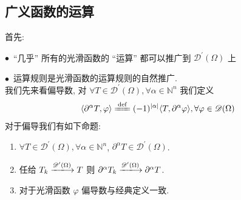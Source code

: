 \documentclass[11pt]{ctexart}[UTF8]
\begin{document}
\subsection{广义函数的运算}
首先:\par
$\bullet$\ ``几乎'' 所有的光滑函数的 ``运算'' 都可以推广到 $\mathscr{D}^{\prime}(\Omega)$ 上\par
$\bullet$\  运算规则是光滑函数的运算规则的自然推广.\\
我们先来看偏导数, 对 $\forall T \in \mathscr{D}^{\prime}(\Omega), \forall \alpha\in \mathbb{N}^{n}$ 我们定义
\begin{equation*}
    \langle \partial^{\alpha} T, \varphi \rangle \xlongequal{\mathrm{def}} (-1)^{|\alpha|} \langle T, \partial^{\alpha} \varphi \rangle, \forall \varphi \in \mathscr{D}(\Omega)
\end{equation*}
对于偏导我们有如下命题:
\begin{proposition}\leavevmode
    \begin{enumerate}
        \item $\forall T \in \mathscr{D}^{\prime}(\Omega), \forall \alpha\in \mathbb{N}^{n}$, $\partial^{\alpha} T\in \mathscr{D}^{\prime}(\Omega)$.
        \item 任给 $T_{k} \xlongrightarrow{\mathscr{D}^{\prime}(\Omega)} T$ 则 $\partial^{\alpha} T_{k} \xlongrightarrow{\mathscr{D}^{\prime}(\Omega)} \partial^{\alpha} T$.
        \item 对于光滑函数 $\varphi$ 偏导数与经典定义一致.
    \end{enumerate}
\end{proposition}
\end{document}
